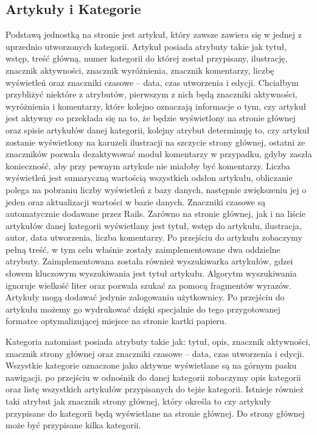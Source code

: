 \documentclass[openright]{xmgr}
\begin{document}
\subsection{Artykuły i Kategorie}
Podstawą jednostką na stronie jest artykuł, który zawsze zawiera się w jednej z uprzednio utworzonych kategorii. Artykuł posiada atrybuty takie jak tytuł, wstęp, treść główną, numer kategorii do której został przypisany, ilustrację, znacznik aktywności, znacznik wyróżnienia, znacznik komentarzy, liczbę wyświetleń oraz znaczniki czasowe – data, czas utworzenia i edycji. Chciałbym przybliżyć niektóre z atrybutów, pierwszym z nich będą znaczniki aktywności, wyróżnienia i komentarzy, które kolejno oznaczają informacje o tym, czy artykuł jest aktywny co przekłada się na to, że będzie wyświetlony na stronie głównej oraz spisie artykułów danej kategorii, kolejny atrybut determinuję to, czy artykuł zostanie wyświetlony na karuzeli ilustracji na szczycie strony głównej, ostatni ze znaczników pozwala dezaktywować moduł komentarzy w przypadku, gdyby zaszła konieczność, aby przy pewnym artykule nie miałoby być komentarzy. Liczba wyświetleń jest sumaryczną wartością wszystkich odsłon artykułu, obliczanie polega na pobraniu liczby wyświetleń z bazy danych, następnie zwiększeniu jej o jeden oraz aktualizacji wartości w bazie danych. Znaczniki czasowe są automatycznie dodawane przez Rails. Zarówno na stronie głównej, jak i na liście artykułów danej kategorii wyświetlany jest tytuł, wstęp do artykułu, ilustracja, autor, data utworzenia, liczba komentarzy. Po przejściu do artykułu zobaczymy pełną treść, w tym celu właśnie zostały zaimplementowane dwa oddzielne atrybuty. Zaimplementowana została również wyszukiwarka artykułów, gdzei słowem kluczowym wyszukiwania jest tytuł artykułu. Algorytm wyszukiwania ignoruje wielkość liter oraz pozwala szukać za pomocą fragmentów wyrazów. Artykuły mogą dodawać jedynie zalogowaniu użytkownicy. Po przejściu do artykułu możemy go wydrukować dzięki specjalnie do tego przygotowanej formatce optymalizującej miejsce na stronie kartki papieru.

Kategoria natomiast posiada atrybuty takie jak: tytuł, opis, znacznik aktywności, znacznik strony głównej oraz znaczniki czasowe – data, czas utworzenia i edycji. Wszystkie kategorie oznaczone jako aktywne wyświetlane są na górnym pasku nawigacji, po przejściu w odnośnik do danej kategorii zobaczymy opis kategorii oraz listę wszystkich artykułów przypisanych do tejże kategorii. Istnieje również taki atrybut jak znacznik strony głównej, który określa to czy artykuły przypisane do kategorii będą wyświetlane na stronie głównej. Do strony głównej może być przypisane kilka kategorii. 
\end{document}
